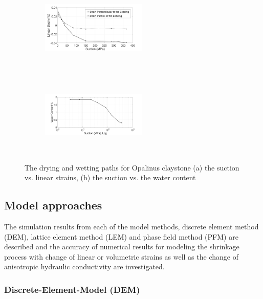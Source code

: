 \begin{figure}[!ht]
\begin{subfigure}[c]{0.48\textwidth}
\centering
\includegraphics[width=5cm,height=4cm]{figures/Amir_ME6_Strain.png}
\subcaption{}
\label{fig:Amir_ME6_Strain}
\end{subfigure}
\hfill
\begin{subfigure}[c]{0.48\textwidth}
\centering
\includegraphics[width=5cm,height=4cm]{figures/Amir_ME6_Water.png}
\subcaption{}
\label{fig:Amir_ME6_Water}
\end{subfigure}
\caption{The drying and wetting paths for Opalinus claystone (a) the suction vs. linear strains, (b) the suction vs. the water content}
\end{figure}


\subsection{Model approaches}

The simulation results from each of the model methods, discrete element method (DEM), lattice element method (LEM) and phase field method (PFM) are described and the accuracy of numerical results for modeling the shrinkage process with change of linear or volumetric strains as well as the change of anisotropic hydraulic conductivity are investigated. 

\subsubsection*{Discrete-Element-Model (DEM)}

